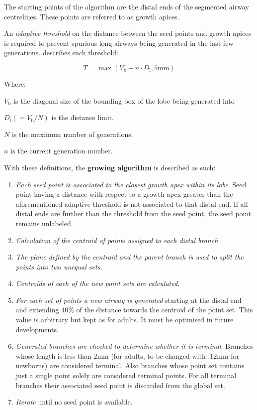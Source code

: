 The starting points of the algorithm are the distal ends of the
segmented airway centrelines.  These points are referred to as growth
apices.

An \emph{adaptive threshold} on the distance between the seed points
and growth apices is required to prevent spurious long airways being
generated in the last few generations.  
describes such threshold:

\begin{equation}
  T = \max(V_{\text{b}} - n\cdot D_{\text{l}}, 5\text{mm})
  \label{eq:airway_threshold}
\end{equation}

Where:
\begin{description}
\item $V_{\text{b}}$ is the diagonal size of the bounding box of the lobe being
  generated into
\item $D_{\text{l}} (= {V_{\text{b}}/{N}})$ is the distance limit.
\item $N$ is the maximum number of generations.
\item $n$ is the current generation number.
\end{description}

With these definitions, the \textbf{growing algorithm} is described as
such:

\begin{enumerate}
\item \emph{Each seed point is associated to the closest growth apex
    within its lobe}.  Seed point having a distance with respect to a
  growth apex greater than the aforementioned adaptive threshold is
  not associated to that distal end.  If all distal ends are further
  than the threshold from the seed point, the seed point remains
  unlabeled.
\item \emph{Calculation of the centroid of points assigned to each
    distal branch.}
\item \emph{The plane defined by the centroid and the parent branch is
    used to split the points into two unequal sets.}
\item \emph{Centroids of each of the new point sets are calculated.}
\item \emph{For each set of points a new airway is generated} starting
  at the distal end and extending 40\% of the distance towards the
  centroid of the point set.  This value is arbitrary but kept as for
  adults.  It must be optimised in future developments.
\item \emph{Generated branches are checked to determine whether it is
    terminal}.  Branches whose length is less than $2\text{mm}$ (for
  adults, to be changed with $.12\text{mm}$ for newborns) are
  considered terminal.  Also branches whose point set contains just a
  single point solely are considered terminal points.  For all
  terminal branches their associated seed point is discarded from the
  global set.
\item \emph{Iterate} until no seed point is available.
\end{enumerate}

